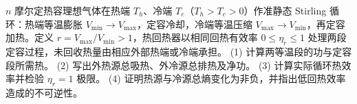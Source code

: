 \(n\) 摩尔定热容理想气体在热端 \(T_h\)、冷端 \(T_c\)（\(T_h>T_c>0\)）作准静态 Stirling 循环：热端等温膨胀 \(V_{\min}\to V_{\max}\)，定容冷却，冷端等温压缩 \(V_{\max}\to V_{\min}\)，再定容加热。定义 \(r=V_{\max}/V_{\min}>1\)，热回热器以相同回热有效率 \(0\le\eta_r\le1\) 处理两段定容过程，未回收热量由相应外部热端或冷端承担。
(1) 计算两等温段的功与定容段所需热。
(2) 写出外热源总吸热、外冷源总排热及净功。
(3) 计算实际循环热效率并检验 \(\eta_r=1\) 极限。
(4) 证明热源与冷源总熵变化为非负，并指出低回热效率造成的不可逆性。
